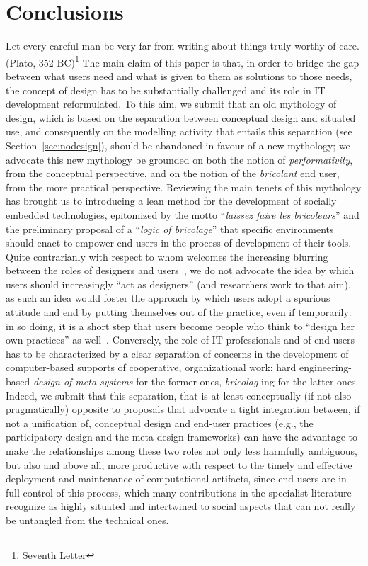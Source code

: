 \documentclass{article}
\let\origquotation\quotation
\let\endorigquotation\endquotation
\renewenvironment{quotation}{\vspace{-0.5\parskip}
  \origquotation
  \footnotesize
}{\endorigquotation}
\begin{document}
\section{Conclusions}
\label{sec:conclusions}
\begin{quotation}
Let every careful man be very far from writing about things truly worthy of care.\\
(Plato, 352 BC)\footnote{Seventh Letter}
\end{quotation}
The main claim of this paper is that, in order to bridge the gap between what users need and what is given to them as solutions to those needs, the concept of design has to be substantially challenged and its role in IT development reformulated. To this aim, we submit that an old mythology of design, which is based on the separation between conceptual design and situated use, and consequently on the modelling activity that entails this separation (see Section~\ref{sec:nodesign}), should be abandoned in favour of a new mythology; we advocate this new mythology be grounded on both the notion of \emph{performativity}, from the conceptual perspective, and on the notion of the \emph{bricolant} end user, from the more practical perspective. Reviewing the main tenets of this mythology has brought us to introducing a lean method for the development of socially embedded technologies, epitomized by the motto ``\emph{laissez faire les bricoleurs}'' and the preliminary proposal of a ``\emph{logic of bricolage}'' that specific environments should enact to empower end-users in the process of development of their tools.
Quite contrarianly with respect to whom welcomes the increasing blurring between the roles of designers and users~\citep[e.g.,][]{fischer_meta-design:_2004,johannessen_users_2012}, we do not advocate the idea by which users should increasingly ``act as designers'' (and researchers work to that aim), as such an idea would foster the approach by which users adopt a spurious attitude and end by putting themselves out of the practice, even if temporarily: in so doing, it is a short step that users become people who think to ``design her own practices'' as well~\citep[as it is claimed even recently by][]{johannessen_users_2012}. Conversely, the role of IT professionals and of end-users has to be characterized by a clear separation of concerns in the development of computer-based supports of cooperative, organizational work: hard engineering-based \emph{design of meta-systems} for the former ones, \emph{bricolag}-ing for the latter ones. Indeed, we submit that this separation, that is at least conceptually (if not also pragmatically) opposite to proposals that advocate a tight integration between, if not a unification of, conceptual design and end-user practices (e.g., the participatory design and the meta-design frameworks) can have the advantage to make the relationships among these two roles not only less harmfully ambiguous, but also and above all, more productive with respect to the timely and effective deployment and maintenance of computational artifacts, since end-users are in full control of this process, which many contributions in the specialist literature recognize as highly situated and intertwined to social aspects that can not really be untangled from the technical ones.
\end{document}
